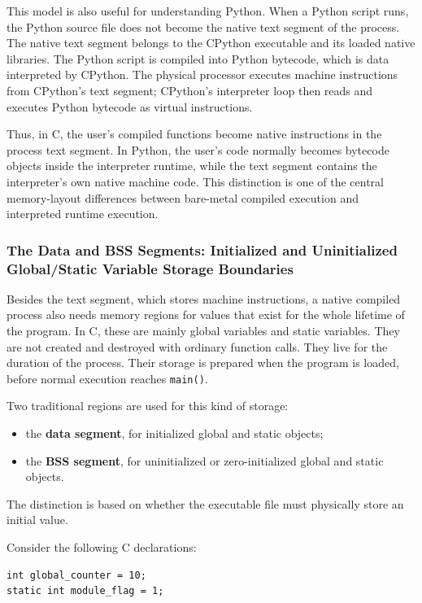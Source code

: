 This model is also useful for understanding Python. When a Python script runs, the Python source file does not become the native text segment of the process. The native text segment belongs to the CPython executable and its loaded native libraries. The Python script is compiled into Python bytecode, which is data interpreted by CPython. The physical processor executes machine instructions from CPython's text segment; CPython's interpreter loop then reads and executes Python bytecode as virtual instructions.

Thus, in C, the user's compiled functions become native instructions in the process text segment. In Python, the user's code normally becomes bytecode objects inside the interpreter runtime, while the text segment contains the interpreter's own native machine code. This distinction is one of the central memory-layout differences between bare-metal compiled execution and interpreted runtime execution.



\subsubsection{The Data and BSS Segments: Initialized and Uninitialized Global/Static Variable Storage Boundaries}

Besides the text segment, which stores machine instructions, a native compiled process also needs memory regions for values that exist for the whole lifetime of the program. In C, these are mainly global variables and static variables. They are not created and destroyed with ordinary function calls. They live for the duration of the process. Their storage is prepared when the program is loaded, before normal execution reaches \texttt{main()}.

Two traditional regions are used for this kind of storage:

\begin{itemize}
    \item the \textbf{data segment}, for initialized global and static objects;
    \item the \textbf{BSS segment}, for uninitialized or zero-initialized global and static objects.
\end{itemize}

The distinction is based on whether the executable file must physically store an initial value.

Consider the following C declarations:

\begin{verbatim}
int global_counter = 10;
static int module_flag = 1;
\end{verbatim}

